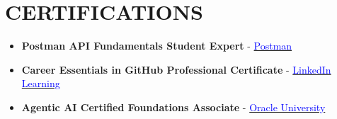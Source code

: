 \documentclass[letterpaper,10pt]{article}
\newcommand{\resumeItem}[1]{
  \item\small{
    {#1 \vspace{-5pt}}
  }
}
\begin{document}



          
\section{CERTIFICATIONS}
        \begin{itemize}[leftmargin=0.15in]
                \resumeItem{\textbf{Postman API Fundamentals Student Expert} - \href{https://badges.parchment.com/public/assertions/lIxz4kcZQTaRUQtREJsZpQ?utm_source=url_copy&identity__email=neerajrajputa786\%40gmail.com}{\textcolor{blue}{{{Postman}}}}}
                \vspace{2pt}
                \resumeItem{\textbf{Career Essentials in GitHub Professional Certificate} - \href{https://www.linkedin.com/learning/certificates/4a85c6690468afa066f430fa525001ebcffd6e3c5325a0a975996129719e2c53?trk=share_certificate}{\textcolor{blue}{{{LinkedIn Learning}}}}}
                \vspace{2pt}
                \resumeItem{\textbf{Agentic AI Certified Foundations Associate} - \href{https://brm-certview.oracle.com/ords/certview/ecertificate?ssn=OC8152734&trackId=AAI26OFA&key=535d12b87a5f36546818d2df620e56fc0e7fac07}{\textcolor{blue}{{{Oracle University}}}}}
                
        \end{itemize}
 \vspace{-8pt} 
\end{document}
